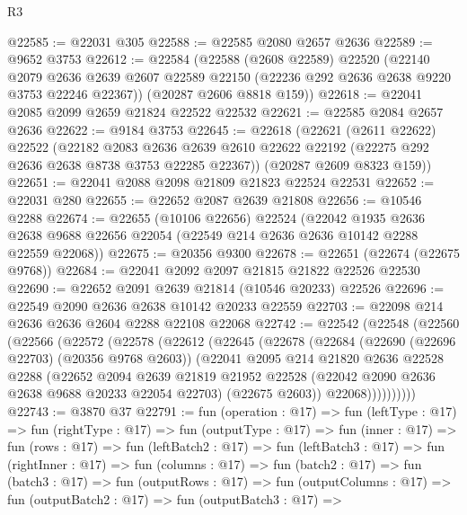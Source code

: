 \begin{lexlean}{R3}
\begin{coremodule}
@22585 := @22031 @305
@22588 := @22585 @2080 @2657 @2636
@22589 := @9652 @3753
@22612 := @22584
    (@22588
      (@2608 @22589)
      @22520
      (@22140
        @2079
        @2636
        @2639
        @2607
        @22589
        @22150
        (@22236 @292 @2636 @2638 @9220 @3753 @22246 @22367))
      (@20287 @2606 @8818 @159))
@22618 := @22041 @2085 @2099 @2659 @21824 @22522 @22532
@22621 := @22585 @2084 @2657 @2636
@22622 := @9184 @3753
@22645 := @22618
    (@22621
      (@2611 @22622)
      @22522
      (@22182
        @2083
        @2636
        @2639
        @2610
        @22622
        @22192
        (@22275 @292 @2636 @2638 @8738 @3753 @22285 @22367))
      (@20287 @2609 @8323 @159))
@22651 := @22041 @2088 @2098 @21809 @21823 @22524 @22531
@22652 := @22031 @280
@22655 := @22652 @2087 @2639 @21808
@22656 := @10546 @2288
@22674 := @22655
    (@10106 @22656)
    @22524
    (@22042
      @1935
      @2636
      @2638
      @9688
      @22656
      @22054
      (@22549 @214 @2636 @2636 @10142 @2288 @22559 @22068))
@22675 := @20356 @9300
@22678 := @22651 (@22674 (@22675 @9768))
@22684 := @22041 @2092 @2097 @21815 @21822 @22526 @22530
@22690 := @22652 @2091 @2639 @21814 (@10546 @20233) @22526
@22696 := @22549 @2090 @2636 @2638 @10142 @20233 @22559
@22703 := @22098 @214 @2636 @2636 @2604 @2288 @22108 @22068
@22742 := @22542
    (@22548
      (@22560
        (@22566
          (@22572
            (@22578
              (@22612
                (@22645
                  (@22678
                    (@22684
                      (@22690 (@22696 @22703) (@20356 @9768 @2603))
                      (@22041
                        @2095
                        @214
                        @21820
                        @2636
                        @22528
                        @2288
                        (@22652
                          @2094
                          @2639
                          @21819
                          @21952
                          @22528
                          (@22042 @2090 @2636 @2638 @9688 @20233 @22054 @22703)
                          (@22675 @2603))
                        @22068))))))))))
@22743 := @3870 @37
@22791 := fun (operation : @17) =>
  fun (leftType : @17) =>
  fun (rightType : @17) =>
  fun (outputType : @17) =>
  fun (inner : @17) =>
  fun (rows : @17) =>
  fun (leftBatch2 : @17) =>
  fun (leftBatch3 : @17) =>
  fun (rightInner : @17) =>
  fun (columns : @17) =>
  fun (batch2 : @17) =>
  fun (batch3 : @17) =>
  fun (outputRows : @17) =>
  fun (outputColumns : @17) =>
  fun (outputBatch2 : @17) =>
  fun (outputBatch3 : @17) =>

\end{coremodule}
\end{lexlean}
